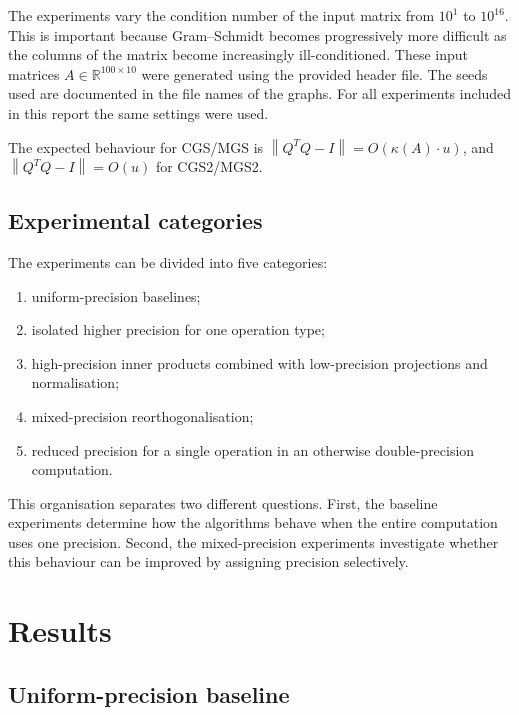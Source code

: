 \documentclass[a4paper,11pt]{article}
\newcommand{\norm}[1]{\left\lVert #1 \right\rVert}
\newcommand{\R}{\mathbb{R}}
\begin{document}
The experiments vary the condition number of the input matrix from $10^{1}$ to $10^{16}$. This is
important because Gram--Schmidt becomes progressively more difficult as the
columns of the matrix become increasingly ill-conditioned. These input matrices $A \in\R^{100\times 10}$ were
generated using the provided header file. The seeds used are documented in the
file names of the graphs. For all experiments included in this report the same settings were used.

The expected behaviour for CGS/MGS is $\norm{Q^TQ-I} = O(\kappa (A) \cdot u)$, and $\norm{Q^TQ-I} = O(u)$
for CGS2/MGS2.

\subsection{Experimental categories}

The experiments can be divided into five categories:

\begin{enumerate}
    \item uniform-precision baselines;
    \item isolated higher precision for one operation type;
    \item high-precision inner products combined with low-precision
    projections and normalisation;
    \item mixed-precision reorthogonalisation;
    \item reduced precision for a single operation in an otherwise
    double-precision computation.
\end{enumerate}

This organisation separates two different questions. First, the baseline
experiments determine how the algorithms behave when the entire computation
uses one precision. Second, the mixed-precision experiments investigate
whether this behaviour can be improved by assigning precision selectively.

\section{Results}

\subsection{Uniform-precision baseline}
\end{document}
